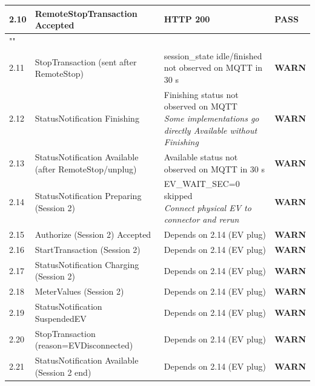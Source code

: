 \documentclass[10pt, a4paper]{article}
\begin{document}
\begin{longtable}{|L{1cm}|L{5.5cm}|M{7cm}|C{1.8cm}|}
\hline
\small 2.10 & \small RemoteStopTransaction  Accepted & HTTP 200 & \textcolor{passgreen}{\textbf{PASS}} \\
\hline
{} \\
\hline
\small 2.11 & \small StopTransaction (sent after RemoteStop) & session\_state idle/finished not observed on MQTT in 30 s & \textcolor{warnorange}{\textbf{WARN}} \\
\hline
\small 2.12 & \small StatusNotification Finishing & Finishing status not observed on MQTT{\newline\normalfont\footnotesize\itshape Some implementations go directly Available without Finishing} & \textcolor{warnorange}{\textbf{WARN}} \\
\hline
\small 2.13 & \small StatusNotification Available (after RemoteStop/unplug) & Available status not observed on MQTT in 30 s & \textcolor{warnorange}{\textbf{WARN}} \\
\hline
\small 2.14 & \small StatusNotification Preparing (Session 2) & EV\_WAIT\_SEC=0  skipped{\newline\normalfont\footnotesize\itshape Connect physical EV to connector and rerun} & \textcolor{warnorange}{\textbf{WARN}} \\
\hline
\small 2.15 & \small Authorize (Session 2)  Accepted & Depends on 2.14 (EV plug) & \textcolor{warnorange}{\textbf{WARN}} \\
\hline
\small 2.16 & \small StartTransaction (Session 2) & Depends on 2.14 (EV plug) & \textcolor{warnorange}{\textbf{WARN}} \\
\hline
\small 2.17 & \small StatusNotification Charging (Session 2) & Depends on 2.14 (EV plug) & \textcolor{warnorange}{\textbf{WARN}} \\
\hline
\small 2.18 & \small MeterValues (Session 2) & Depends on 2.14 (EV plug) & \textcolor{warnorange}{\textbf{WARN}} \\
\hline
\small 2.19 & \small StatusNotification SuspendedEV & Depends on 2.14 (EV plug) & \textcolor{warnorange}{\textbf{WARN}} \\
\hline
\small 2.20 & \small StopTransaction (reason=EVDisconnected) & Depends on 2.14 (EV plug) & \textcolor{warnorange}{\textbf{WARN}} \\
\hline
\small 2.21 & \small StatusNotification Available (Session 2 end) & Depends on 2.14 (EV plug) & \textcolor{warnorange}{\textbf{WARN}} \\
\hline
\end{longtable}
\normalsize
\end{document}
